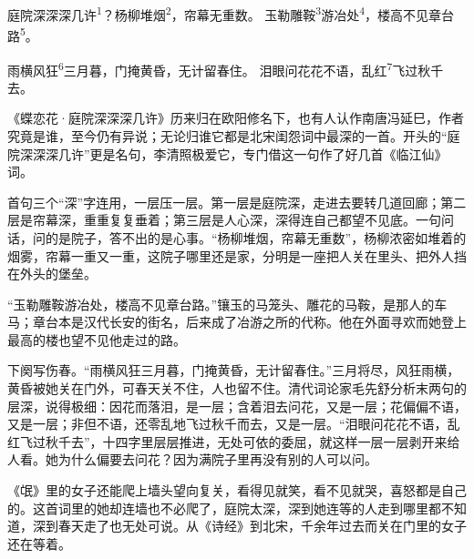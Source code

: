 
\begin{poem}
庭院深深深几许\textsuperscript{1}？杨柳堆烟\textsuperscript{2}，帘幕无重数。
玉勒雕鞍\textsuperscript{3}游冶处\textsuperscript{4}，楼高不见章台路\textsuperscript{5}。

雨横风狂\textsuperscript{6}三月暮，门掩黄昏，无计留春住。
泪眼问花花不语，乱红\textsuperscript{7}飞过秋千去。
\end{poem}

\begin{annotations}
\end{annotations}

\begin{appreciation}
《蝶恋花·庭院深深深几许》历来归在欧阳修名下，也有人认作南唐冯延巳，作者究竟是谁，至今仍有异说；无论归谁它都是北宋闺怨词中最深的一首。开头的“庭院深深深几许”更是名句，李清照极爱它，专门借这一句作了好几首《临江仙》词。

首句三个“深”字连用，一层压一层。第一层是庭院深，走进去要转几道回廊；第二层是帘幕深，重重复复垂着；第三层是人心深，深得连自己都望不见底。一句问话，问的是院子，答不出的是心事。“杨柳堆烟，帘幕无重数”，杨柳浓密如堆着的烟雾，帘幕一重又一重，这院子哪里还是家，分明是一座把人关在里头、把外人挡在外头的堡垒。

“玉勒雕鞍游冶处，楼高不见章台路。”镶玉的马笼头、雕花的马鞍，是那人的车马；章台本是汉代长安的街名，后来成了冶游之所的代称。他在外面寻欢而她登上最高的楼也望不见他走过的路。

下阕写伤春。“雨横风狂三月暮，门掩黄昏，无计留春住。”三月将尽，风狂雨横，黄昏被她关在门外，可春天关不住，人也留不住。清代词论家毛先舒分析末两句的层深，说得极细：因花而落泪，是一层；含着泪去问花，又是一层；花偏偏不语，又是一层；非但不语，还零乱地飞过秋千而去，又是一层。“泪眼问花花不语，乱红飞过秋千去”，十四字里层层推进，无处可依的委屈，就这样一层一层剥开来给人看。她为什么偏要去问花？因为满院子里再没有别的人可以问。

《氓》里的女子还能爬上墙头望向复关，看得见就笑，看不见就哭，喜怒都是自己的。这首词里的她却连墙也不必爬了，庭院太深，深到她连等的人走到哪里都不知道，深到春天走了也无处可说。从《诗经》到北宋，千余年过去而关在门里的女子还在等着。
\end{appreciation}
